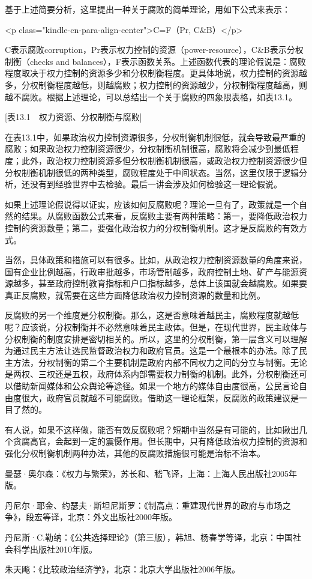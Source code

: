 基于上述简要分析，这里提出一种关于腐败的简单理论，用如下公式来表示：

<p class="kindle-cn-para-align-center">C=F（Pr, C\&B）</p>

C表示腐败corruption，Pr表示权力控制的资源（power-resource），C\&B表示分权制衡（checks and balances），F表示函数关系。上述函数代表的理论假说是：腐败程度取决于权力控制的资源多少和分权制衡程度。更具体地说，权力控制的资源越多，分权制衡程度越低，则越腐败；权力控制的资源越少，分权制衡程度越高，则越不腐败。根据上述理论，可以总结出一个关于腐败的四象限表格，如表13.1。

[表13.1　权力资源、分权制衡与腐败]

在表13.1中，如果政治权力控制资源很多，分权制衡机制很低，就会导致最严重的腐败；如果政治权力控制资源很少，分权制衡机制很高，腐败将会减少到最低程度；此外，政治权力控制资源多但分权制衡机制很高，或政治权力控制资源很少但分权制衡机制很低的两种类型，腐败程度处于中间状态。当然，这里仅限于逻辑分析，还没有到经验世界中去检验。最后一讲会涉及如何检验这一理论假说。

如果上述理论假说得以证实，应该如何反腐败呢？理论一旦有了，政策就是一个自然的结果。从腐败函数公式来看，反腐败主要有两种策略：第一，要降低政治权力控制的资源数量；第二，要强化政治权力的分权制衡机制。这才是反腐败的有效方式。

当然，具体政策和措施可以有很多。比如，从政治权力控制资源数量的角度来说，国有企业比例越高，行政审批越多，市场管制越多，政府控制土地、矿产与能源资源越多，甚至政府控制教育指标和户口指标越多，总体上该国就会越腐败。如果要真正反腐败，就需要在这些方面降低政治权力控制资源的数量和比例。

反腐败的另一个维度是分权制衡。那么，这是否意味着越民主，腐败程度就越低呢？应该说，分权制衡并不必然意味着民主政体。但是，在现代世界，民主政体与分权制衡的制度安排是密切相关的。所以，这里的分权制衡，第一层含义可以理解为通过民主方法让选民监督政治权力和政府官员。这是一个最根本的办法。除了民主方法，分权制衡的第二个主要机制是政府内部不同权力之间的分立与制衡。无论是两权、三权还是五权，政府体系内部需要权力制衡的机制。此外，分权制衡还可以借助新闻媒体和公众舆论等途径。如果一个地方的媒体自由度很高，公民言论自由度很大，政府官员就越不可能腐败。借助这一理论框架，反腐败的政策建议是一目了然的。

有人说，如果不这样做，能否有效反腐败呢？短期中当然是有可能的，比如揪出几个贪腐高官，会起到一定的震慑作用。但长期中，只有降低政治权力控制的资源和强化分权制衡机制两种办法，其他的反腐败措施很可能是治标不治本。


曼瑟·奥尔森：《权力与繁荣》，苏长和、嵇飞译，上海：上海人民出版社2005年版。

丹尼尔·耶金、约瑟夫·斯坦尼斯罗：《制高点：重建现代世界的政府与市场之争》，段宏等译，北京：外文出版社2000年版。

丹尼斯·C.勒纳：《公共选择理论》（第三版），韩旭、杨春学等译，北京：中国社会科学出版社2010年版。

朱天飚：《比较政治经济学》，北京：北京大学出版社2006年版。
